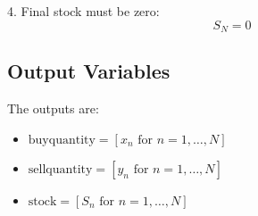 \documentclass{article}
\begin{document}
4. Final stock must be zero:
\[
S_N = 0
\]

\subsection*{Output Variables}
The outputs are:
\begin{itemize}
    \item \( \text{buyquantity} = [x_n \text{ for } n = 1, \ldots, N] \)
    \item \( \text{sellquantity} = [y_n \text{ for } n = 1, \ldots, N] \)
    \item \( \text{stock} = [S_n \text{ for } n = 1, \ldots, N] \)
\end{itemize}
\end{document}
